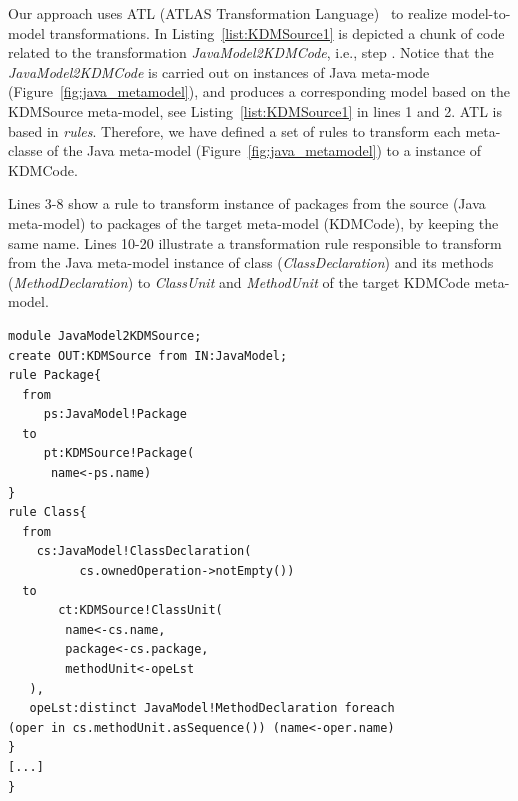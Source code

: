 \documentclass[a4paper,twoside]{article}
\newcommand*\circled[1]{\tikz[baseline=(char.base)]{
  \node[shape=circle,draw, inner sep=0.1pt] (char) {#1};}
}
\begin{document}

 Our approach uses ATL (ATLAS Transformation Language)~\cite{Jouault200831} to realize model-to-model transformations. In Listing~\ref{list:KDMSource1} is depicted a chunk of code related to the transformation \textit{JavaModel2KDMCode}, i.e., step \circled{\textbf{E}}. Notice that the \textit{JavaModel2KDMCode} is carried out on instances of Java meta-mode (Figure~\ref{fig:java_metamodel}), and produces a corresponding model based on the KDMSource meta-model, see Listing~\ref{list:KDMSource1} in lines 1 and 2. ATL is based in \textit{rules}. Therefore, we have defined a set of rules to transform each meta-classe of the Java meta-model (Figure~\ref{fig:java_metamodel}) to a instance of KDMCode. 


Lines  3-8 show a rule to transform instance of packages from the source (Java meta-model) to packages of the target meta-model (KDMCode), by keeping the same name. Lines 10-20 illustrate a transformation rule responsible to transform from the Java meta-model instance of class (\textit{ClassDeclaration}) and its methods (\textit{MethodDeclaration}) to \textit{ClassUnit} and \textit{MethodUnit} of the target KDMCode meta-model.



\begin{lstlisting}[caption=Chunk of JavaModel2KDMCode, label=list:KDMSource1, frame=lrtb, basicstyle=\tiny]
module JavaModel2KDMSource;
create OUT:KDMSource from IN:JavaModel;
rule Package{ 
  from
     ps:JavaModel!Package 
  to
     pt:KDMSource!Package( 
	  name<-ps.name)
} 
rule Class{ 
  from
    cs:JavaModel!ClassDeclaration(
          cs.ownedOperation->notEmpty())
  to
       ct:KDMSource!ClassUnit(
        name<-cs.name,
        package<-cs.package,
        methodUnit<-opeLst
   ),
   opeLst:distinct JavaModel!MethodDeclaration foreach
(oper in cs.methodUnit.asSequence()) (name<-oper.name)
}
[...]
}
\end{lstlisting}
\end{document}
